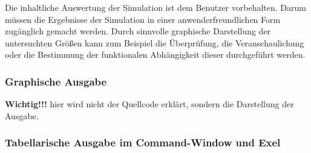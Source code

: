 Die inhaltliche Auswertung der Simulation ist dem Benutzer vorbehalten. Darum müssen die Ergebnisse der Simulation in einer
anwenderfreundlichen Form zugänglich gemacht werden. Durch sinnvolle graphische Darstellung der untersuchten Größen kann zum
Beispiel die Überprüfung, die Veranschaulichung oder die Bestimmung der funktionalen Abhängigkeit dieser durchgeführt werden.


\subsubsection{Graphische Ausgabe}
\textbf{Wichtig!!!} hier wird nicht der Quellcode erklärt, sondern die Darstellung der Ausgabe.
\subsubsection{Tabellarische Ausgabe im Command-Window und Exel}

